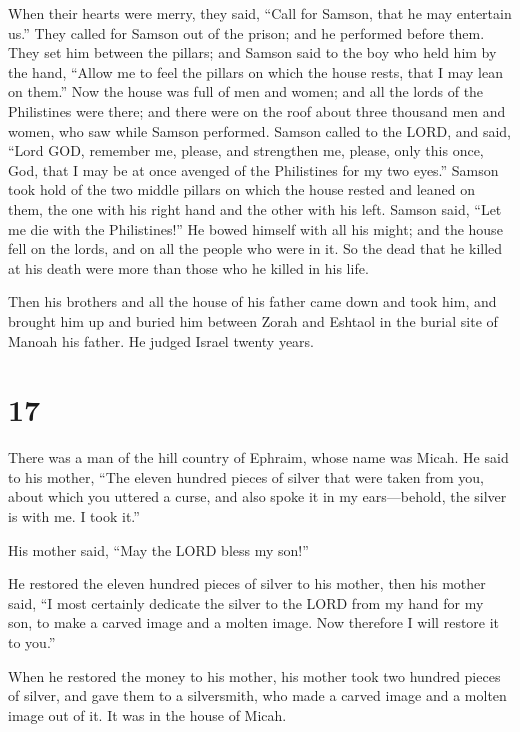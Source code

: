  When their hearts were merry, they said, ``Call for
Samson, that he may entertain us.'' They called for Samson out of the
prison; and he performed before them. They set him between the pillars;
 and Samson said to the boy who held him by the hand,
``Allow me to feel the pillars on which the house rests, that I may lean
on them.''  Now the house was full of men and women; and
all the lords of the Philistines were there; and there were on the roof
about three thousand men and women, who saw while Samson performed.
 Samson called to the LORD, and said, ``Lord GOD,
remember me, please, and strengthen me, please, only this once, God,
that I may be at once avenged of the Philistines for my two eyes.''
 Samson took hold of the two middle pillars on which the
house rested and leaned on them, the one with his right hand and the
other with his left.  Samson said, ``Let me die with the
Philistines!'' He bowed himself with all his might; and the house fell
on the lords, and on all the people who were in it. So the dead that he
killed at his death were more than those who he killed in his life.

 Then his brothers and all the house of his father came
down and took him, and brought him up and buried him between Zorah and
Eshtaol in the burial site of Manoah his father. He judged Israel twenty
years.

\hypertarget{section-16}{%
\section{17}\label{section-16}}

 There was a man of the hill country of Ephraim, whose
name was Micah.  He said to his mother, ``The eleven
hundred pieces of silver that were taken from you, about which you
uttered a curse, and also spoke it in my ears---behold, the silver is
with me. I took it.''

His mother said, ``May the LORD bless my son!''

 He restored the eleven hundred pieces of silver to his
mother, then his mother said, ``I most certainly dedicate the silver to
the LORD from my hand for my son, to make a carved image and a molten
image. Now therefore I will restore it to you.''

 When he restored the money to his mother, his mother took
two hundred pieces of silver, and gave them to a silversmith, who made a
carved image and a molten image out of it. It was in the house of Micah.

